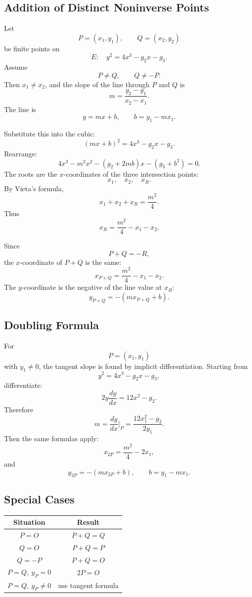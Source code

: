 \documentclass[11pt]{article}
\begin{document}
\subsection{Addition of Distinct Noninverse Points}

Let
\[
P=(x_1,y_1),
\qquad
Q=(x_2,y_2)
\]
be finite points on
\[
E:\quad y^2=4x^3-g_2x-g_3.
\]
Assume
\[
P\neq Q,
\qquad
Q\neq -P.
\]
Then \(x_1\neq x_2\), and the slope of the line through \(P\) and \(Q\) is
\[
m=\frac{y_2-y_1}{x_2-x_1}.
\]
The line is
\[
y=mx+b,
\qquad
b=y_1-mx_1.
\]

Substitute this into the cubic:
\[
(mx+b)^2=4x^3-g_2x-g_3.
\]
Rearrange:
\[
4x^3-m^2x^2-(g_2+2mb)x-(g_3+b^2)=0.
\]
The roots are the \(x\)-coordinates of the three intersection points:
\[
x_1,\quad x_2,\quad x_R.
\]
By Vieta's formula,
\[
x_1+x_2+x_R=\frac{m^2}{4}.
\]
Thus
\[
x_R=\frac{m^2}{4}-x_1-x_2.
\]

Since
\[
P+Q=-R,
\]
the \(x\)-coordinate of \(P+Q\) is the same:
\[
\boxed{
x_{P+Q}=\frac{m^2}{4}-x_1-x_2.
}
\]
The \(y\)-coordinate is the negative of the line value at \(x_R\):
\[
\boxed{
y_{P+Q}=-(mx_{P+Q}+b).
}
\]

\subsection{Doubling Formula}

For
\[
P=(x_1,y_1)
\]
with \(y_1\neq0\), the tangent slope is found by implicit differentiation.
Starting from
\[
y^2=4x^3-g_2x-g_3,
\]
differentiate:
\[
2y\frac{dy}{dx}=12x^2-g_2.
\]
Therefore
\[
m=\frac{dy}{dx}\bigg|_P
=
\frac{12x_1^2-g_2}{2y_1}.
\]
Then the same formulas apply:
\[
\boxed{
x_{2P}=\frac{m^2}{4}-2x_1,
}
\]
and
\[
\boxed{
y_{2P}=-(mx_{2P}+b),
\qquad
b=y_1-mx_1.
}
\]

\subsection{Special Cases}

\begin{center}
\begin{tabular}{c|c}
Situation & Result\\
\hline
\(P=O\) & \(P+Q=Q\)\\
\(Q=O\) & \(P+Q=P\)\\
\(Q=-P\) & \(P+Q=O\)\\
\(P=Q,\ y_P=0\) & \(2P=O\)\\
\(P=Q,\ y_P\neq0\) & use tangent formula
\end{tabular}
\end{center}
\end{document}
